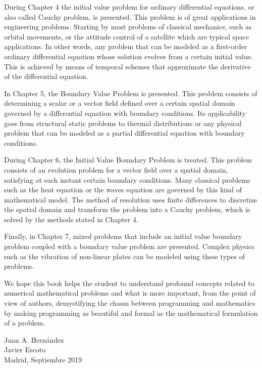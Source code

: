 During Chapter 4 the initial value problem for ordinary differential equations, or also called Cauchy problem, is presented. This problem is of great applications in engineering problems. Starting by most problems of classical mechanics, such as orbital movements, or the attitude control of a satellite which are typical space applications. In other words, any problem that can be modeled as a first-order ordinary differential equation whose solution evolves from a certain initial value. This is achieved by means of temporal schemes that approximate the derivative of the differential equation. 

In Chapter 5, the Boundary Value Problem is presented. This problem consists of determining a scalar or a vector field defined over a certain spatial domain governed by a differential equation with boundary conditions. Its applicability goes from structural static problems to thermal distributions or any physical problem that can be modeled as a partial differential equation with boundary conditions. 

During Chapter 6, the Initial Value Boundary Problem is treated. This problem consists of an evolution problem for a vector field over a spatial domain, satisfying at each instant certain boundary conditions. Many classical problems such as the heat equation or the waves equation are governed by this kind of mathematical model. The method of resolution uses finite differences to discretize the spatial domain and transform the problem into a Cauchy problem, which is solved by the methods stated in Chapter 4.

Finally, in Chapter 7, mixed problems that include an initial value boundary problem coupled with a boundary value problem are presented. Complex physics such as the vibration of non-linear plates can be modeled using these types of problems. 

We hope this book helps the student to understand profound concepts related to numerical mathematical problems and what is more important,  from the point of view of authors, 
demystifying the chasm between programming and mathematics by making programming as beautiful and formal as the mathematical formulation of a problem. 

\begin{flushright}
	Juan A. Hernández \\
	Javier Escoto \\
	Madrid, Septiembre 2019
\end{flushright}

























